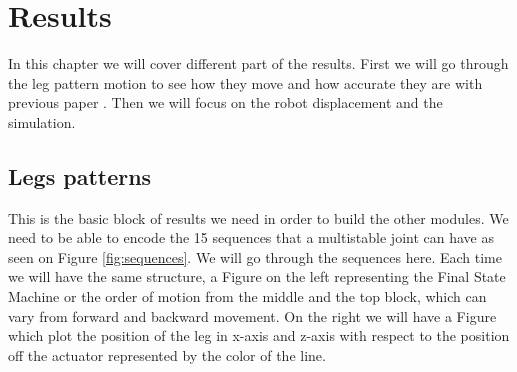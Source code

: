 \chapter{Results}
    In this chapter we will cover different part of the results. First we will go through the leg pattern motion to see how they move and how accurate they are with previous paper \cite{mo_main_paper}. Then we will focus on the robot displacement and the simulation. 
    \section{Legs patterns}
        This is the basic block of results we need in order to build the other modules. We need to be able to encode the 15 sequences that a multistable joint can have as seen on Figure \ref{fig:sequences}. We will go through the sequences here. Each time we will have the same structure, a Figure on the left representing the Final State Machine or the order of motion from the middle and the top block, which can vary from forward and backward movement. On the right we will have a Figure which plot the position of the leg in x-axis and z-axis with respect to the position off the actuator represented by the color of the line.
